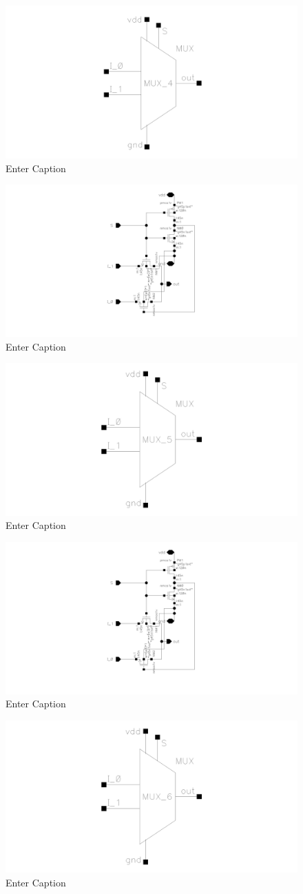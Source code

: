 \documentclass[12pt]{article}
\begin{document}
\begin{figure}[H]
    \centering
    \includegraphics[width=0.5\linewidth]{writeup//figures/mux_w1_opt_sym.png}
    \caption{Enter Caption}
\end{figure}

\begin{figure}[H]
    \centering
    \includegraphics[width=0.5\linewidth]{writeup//figures/mux_w2_opt.png}
    \caption{Enter Caption}
\end{figure}

\begin{figure}[H]
    \centering
    \includegraphics[width=0.5\linewidth]{writeup//figures/mux_w2_opt_sym.png}
    \caption{Enter Caption}
\end{figure}

\begin{figure}[H]
    \centering
    \includegraphics[width=0.5\linewidth]{writeup//figures/mux_w3_opt.png}
    \caption{Enter Caption}
\end{figure}

\begin{figure}[H]
    \centering
    \includegraphics[width=0.5\linewidth]{writeup//figures/mux_w3_opt_sym.png}
    \caption{Enter Caption}
\end{figure}
\end{document}
